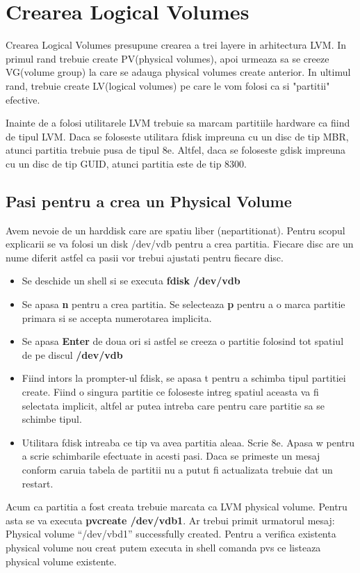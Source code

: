 \section{Crearea Logical Volumes}
Crearea Logical Volumes presupune crearea a trei layere in arhitectura LVM. In primul rand trebuie create PV(physical volumes), apoi urmeaza sa se creeze VG(volume group) la care se adauga physical volumes create anterior. In ultimul rand, trebuie create LV(logical volumes) pe care le vom folosi ca si "partitii" efective.
\par
Inainte de a folosi utilitarele LVM trebuie sa marcam partitiile hardware ca fiind de tipul LVM. Daca se foloseste utilitara fdisk impreuna cu un disc de tip MBR, atunci partitia trebuie pusa de tipul 8e. Altfel, daca se foloseste gdisk impreuna cu un disc de tip GUID, atunci partitia este de tip 8300.
\subsection{Pasi pentru a crea un Physical Volume}
Avem nevoie de un harddisk care are spatiu liber (nepartitionat). Pentru scopul explicarii se va folosi un disk /dev/vdb pentru a crea partitia. Fiecare disc are un nume diferit astfel ca pasii vor trebui ajustati pentru fiecare disc.
\begin{itemize}
\item Se deschide un shell si se executa \textbf{fdisk /dev/vdb}
\item Se apasa \textbf{n} pentru a crea partitia. Se selecteaza \textbf{p} pentru a o marca partitie primara si se accepta numerotarea implicita.
\item Se apasa \textbf{Enter} de doua ori si astfel se creeza o partitie folosind tot spatiul de pe discul \textbf{/dev/vdb}
\item Fiind intors la prompter-ul fdisk, se apasa t pentru a schimba tipul partitiei create. Fiind o singura partitie ce foloseste intreg spatiul aceasta va fi selectata implicit, altfel ar putea intreba care pentru care partitie sa se schimbe tipul. 
\item Utilitara fdisk intreaba ce tip va avea partitia aleaa. Scrie 8e. Apasa w pentru a scrie schimbarile efectuate in acesti pasi. Daca se primeste un mesaj conform caruia tabela de partitii nu a putut fi actualizata trebuie dat un restart. 
\end{itemize}
Acum ca partitia a fost creata trebuie marcata ca LVM physical volume. Pentru asta se va executa \textbf{pvcreate /dev/vdb1}. Ar trebui primit urmatorul mesaj: Physical volume “/dev/vbd1” successfully created. Pentru a verifica existenta physical volume nou creat putem executa in shell comanda pvs ce listeaza physical volume existente.
